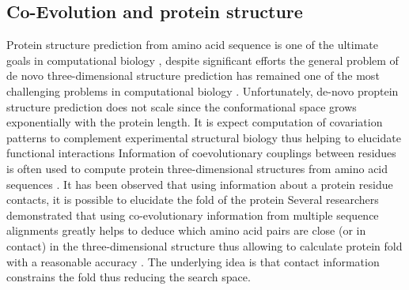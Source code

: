 %

\subsection{Co-Evolution and protein structure}

Protein structure prediction from amino acid sequence is one of the ultimate goals in computational biology \cite{burger2010disentangling}, despite significant efforts the general problem of de novo three-dimensional structure prediction has remained one of the most challenging problems in computational biology \cite{marks2012protein}.
Unfortunately, de-novo proptein structure prediction does not scale since the conformational space grows exponentially with the protein length.
It is expect computation of covariation patterns to complement experimental structural biology thus helping to elucidate functional interactions  \cite{marks2012protein}
Information of coevolutionary couplings between residues is often used to compute protein three-dimensional structures from amino acid sequences \cite{marks2012protein}.
It has been observed that using information about a protein residue contacts, it is possible to elucidate the fold of the protein \cite{jones2012psicov}
Several researchers demonstrated that using co-evolutionary information from multiple sequence alignments greatly helps to deduce which amino acid pairs are close (or in contact) in the three-dimensional structure thus allowing to calculate protein fold with a reasonable accuracy \cite{marks2012protein}.
The underlying idea is that contact information constrains the fold thus reducing the search space.

